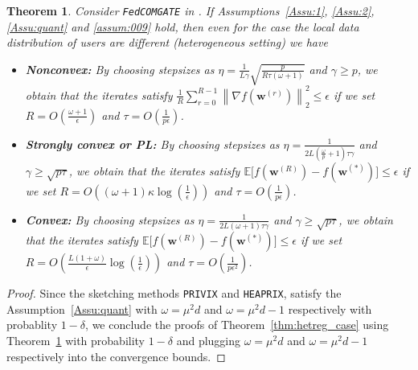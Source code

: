 \documentclass[twoside]{article}
\newtheorem{theorem}{Theorem}
\begin{document}
\begin{theorem}\label{thm:fromhaddad-het}
 Consider \texttt{FedCOMGATE} in \cite{haddadpour2020federated}. If Assumptions~\ref{Assu:1}, \ref{Assu:2}, \ref{Assu:quant}  and \ref{assum:009} hold, then even for the case the local data distribution of users are different  (heterogeneous setting) we have
 \begin{itemize}
     \item \textbf{Nonconvex:} By choosing stepsizes as $\eta=\frac{1}{L\gamma}\sqrt{\frac{p}{R\tau\left(\omega+1\right)}}$ and $\gamma\geq p$, we obtain that the iterates satisfy  $\frac{1}{R}\sum_{r=0}^{R-1}\left\|\nabla f({\boldsymbol{w}}^{(r)})\right\|_2^2\leq \epsilon$ if we set
     $R=O\left(\frac{\omega+1}{\epsilon}\right)$ and $ \tau=O\left(\frac{1}{p\epsilon}\right)$.
     \item \textbf{Strongly convex or PL:}
      By choosing stepsizes as $\eta=\frac{1}{2L\left(\frac{\omega}{p}+1\right)\tau\gamma}$ and ${\gamma\geq \sqrt{p\tau}}$, we obtain that the iterates satisfy $\mathbb{E}\Big[f({\boldsymbol{w}}^{(R)})-f({\boldsymbol{w}}^{(*)})\Big]\leq \epsilon$ if we set
      $R=O\left(\left(\omega+1\right)\kappa\log\left(\frac{1}{\epsilon}\right)\right)$ and $ \tau=O\left(\frac{1}{p\epsilon}\right)$.
     \item \textbf{Convex:}  By choosing stepsizes as $\eta=\frac{1}{2L\left(\omega+1\right)\tau\gamma}$ and ${\gamma\geq \sqrt{p\tau}}$, we obtain that the iterates satisfy $\mathbb{E}\Big[f({\boldsymbol{w}}^{(R)})-f({\boldsymbol{w}}^{(*)})\Big]\leq \epsilon$ if we set
     $R=O\left(\frac{L\left(1+\omega\right)}{\epsilon}\log\left(\frac{1}{\epsilon}\right)\right)$ and $ \tau=O\left(\frac{1}{p\epsilon^2}\right)$.
 \end{itemize}
 
\end{theorem}
\begin{proof}
Since the sketching methods \texttt{PRIVIX} and \texttt{HEAPRIX}, satisfy the Assumption~\ref{Assu:quant} with $\omega=\mu^2d$ and $\omega=\mu^2d-1$ respectively with probablity $1-\delta$, we conclude the proofs of Theorem~\ref{thm:hetreg_case} using Theorem~\ref{thm:fromhaddad-het} with probability $1-\delta$ and plugging $\omega=\mu^2d$ and $\omega=\mu^2d-1$ respectively into the convergence bounds.
\end{proof}
\end{document}
